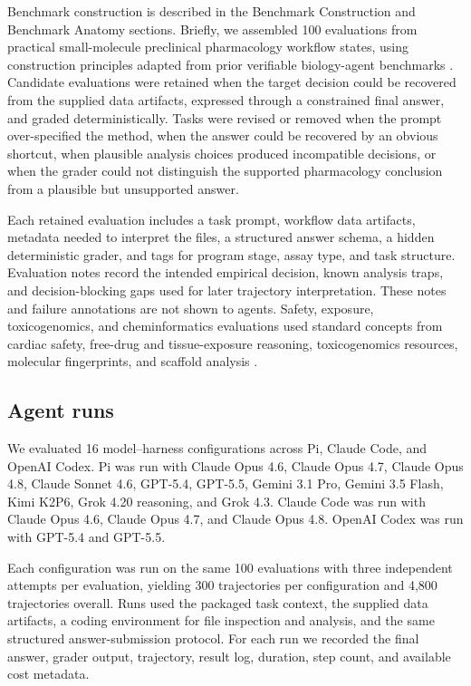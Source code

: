 \documentclass[10pt,letterpaper]{article}
\begin{document}
Benchmark construction is described in the Benchmark Construction and Benchmark
Anatomy sections. Briefly, we assembled 100 evaluations from practical
small-molecule preclinical pharmacology workflow states, using construction
principles adapted from prior verifiable biology-agent benchmarks
\cite{spatialbenchlong2026,spatialbench2025,scbench2026}. Candidate
evaluations were retained when the target decision could be recovered from the
supplied data artifacts, expressed through a constrained final answer, and
graded deterministically. Tasks were revised or removed when the prompt
over-specified the method, when the answer could be recovered by an obvious
shortcut, when plausible analysis choices produced incompatible decisions, or
when the grader could not distinguish the supported pharmacology conclusion
from a plausible but unsupported answer.

Each retained evaluation includes a task prompt, workflow data artifacts,
metadata needed to interpret the files, a structured answer schema, a hidden
deterministic grader, and tags for program stage, assay type, and task
structure. Evaluation notes record the intended empirical decision, known
analysis traps, and decision-blocking gaps used for later trajectory
interpretation. These notes and failure annotations are not shown to agents.
Safety, exposure, toxicogenomics, and cheminformatics evaluations used standard
concepts from cardiac safety, free-drug and tissue-exposure reasoning,
toxicogenomics resources, molecular fingerprints, and scaffold analysis
\cite{redfern2003,ichs7b2005,gintant2016,webborn2025,zhang2019,huang2016,igarashi2015,rogers2010,bemis1996}.

\subsection{Agent runs}

We evaluated 16 model--harness configurations across Pi, Claude Code, and
OpenAI Codex. Pi was run with Claude Opus 4.6, Claude Opus 4.7, Claude Opus
4.8, Claude Sonnet 4.6, GPT-5.4, GPT-5.5, Gemini 3.1 Pro, Gemini 3.5 Flash,
Kimi K2P6, Grok 4.20 reasoning, and Grok 4.3. Claude Code was run with Claude
Opus 4.6, Claude Opus 4.7, and Claude Opus 4.8. OpenAI Codex was run with
GPT-5.4 and GPT-5.5.

Each configuration was run on the same 100 evaluations with three independent
attempts per evaluation, yielding 300 trajectories per configuration and 4,800
trajectories overall. Runs used the packaged task context, the supplied data
artifacts, a coding environment for file inspection and analysis, and the same
structured answer-submission protocol. For each run we recorded the final
answer, grader output, trajectory, result log, duration, step count, and
available cost metadata.
\end{document}
